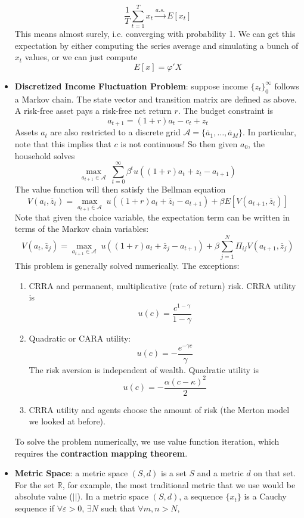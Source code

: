 \documentclass[12pt]{article}
\begin{document}
\begin{itemize}
    \[\frac{1}{T}\sum_{t=1}^Tx_t \overset{a.s.}{\to} E[x_t]\]
    This means almost surely, i.e. converging with probability 1. We can get this expectation by either computing the series average and simulating a bunch of $x_t$ values, or we can just compute
    \[E[x] = \varphi'X\]
    \item \textbf{Discretized Income Fluctuation Problem}: suppose income $\{z_t\}_0^{\infty}$ follows a Markov chain. The state vector and transition matrix are defined as above. A risk-free asset pays a risk-free net return $r$. The budget constraint is
    \[a_{t+1} = (1+r)a_t - c_t+z_t\]
    Assets $a_t$ are also restricted to a discrete grid $\mathcal{A} = \{\overline{a}_1, \hdots, \overline{a}_M\}$. In particular, note that this implies that $c$ is not continuous! So then given $a_0$, the household solves
    \[\max_{a_{t+1}\in\mathcal{A}}\;\sum_{t=0}^{\infty}\beta^tu\left((1+r)a_t + z_t - a_{t+1}\right)\]
    The value function will then satisfy the Bellman equation
    \[V(a_t, \overline{z}_t) = \max_{a_{t+1} \in \mathcal{A}}\; u\left((1+r)a_t + \overline{z}_t - a_{t+1}\right) + \beta E[V(a_{t+1}, \overline{z}_t)]\]
    Note that given the choice variable, the expectation term can be written in terms of the Markov chain variables:
    \[V(a_t, \overline{z}_j) = \max_{a_{t+1} \in \mathcal{A}}\; u\left((1+r)a_t + \overline{z}_j - a_{t+1}\right) + \beta \sum_{j=1}^N\Pi_{ij}V(a_{t+1}, \overline{z}_j)\]
    This problem is generally solved numerically. The exceptions:
    \begin{enumerate}
        \item CRRA and permanent, multiplicative (rate of return) risk. CRRA utility is
        \[u(c) = \frac{c^{1-\gamma}}{1-\gamma}\]
        \item Quadratic or CARA utility:
        \[u(c) = -\frac{e^{-\gamma c}}{\gamma}\]
        The risk aversion is independent of wealth. Quadratic utility is
        \[u(c) = -\frac{\alpha(c-\kappa)^2}{2}\]
        \item CRRA utility and agents choose the amount of risk (the Merton model we looked at before). 
    \end{enumerate}
    To solve the problem numerically, we use value function iteration, which requires the \textbf{contraction mapping theorem}.
    \item \textbf{Metric Space}: a metric space $(S,d)$ is a set $S$ and a metric $d$ on that set. For the set $\mathds{R}$, for example, the most traditional metric that we use would be absolute value ($| |$). In a metric space $(S,d)$, a sequence $\{x_t\}$ is a Cauchy sequence if $\forall \varepsilon > 0$, $\exists N$ such that $\forall m,n > N$, 

\end{itemize}
\end{document}

